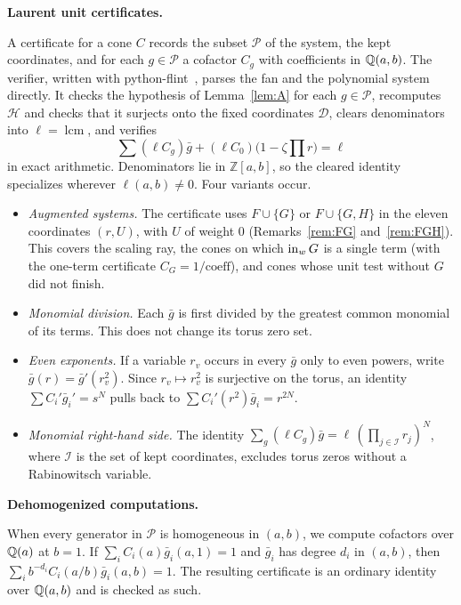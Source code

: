 \documentclass[11pt]{amsart}
\newcommand{\topic}[1]{\par\addvspace{1.4ex}\noindent\textbf{#1}\par\nobreak\smallskip\noindent}
\newcommand{\Z}{\mathbb{Z}}
\theoremstyle{definition}\newtheorem{definition}[theorem]{Definition}\theoremstyle{remark}\newtheorem{remark}[theorem]{Remark}
\begin{document}
\topic{Laurent unit certificates.} A certificate for a cone $C$ records the subset $\mathcal P$ of the system, the kept coordinates, and for each $g\in\mathcal P$ a cofactor $C_g$ with coefficients in $\mathbb{Q}(a,b)$. The verifier, written with python-flint~\citep{flint}, parses the fan and the polynomial system directly. It checks the hypothesis of Lemma~\ref{lem:A} for each $g\in\mathcal P$, recomputes $\mathcal H$ and checks that it surjects onto the fixed coordinates $\mathcal D$, clears denominators into $\ell=\operatorname{lcm}$, and verifies
\[
 \sum (\ell C_g)\bar g+(\ell C_0)\bigl(1-\zeta\textstyle\prod r\bigr)=\ell
\]
in exact arithmetic. Denominators lie in $\Z[a,b]$, so the cleared identity specializes wherever $\ell(a,b)\ne0$. Four variants occur.
\begin{itemize}
\item \emph{Augmented systems.} The certificate uses $F\cup\{G\}$ or $F\cup\{G,H\}$ in the eleven coordinates $(r,U)$, with $U$ of weight $0$ (Remarks~\ref{rem:FG} and~\ref{rem:FGH}). This covers the scaling ray, the cones on which $\operatorname{in}_wG$ is a single term (with the one-term certificate $C_G=1/\mathrm{coeff}$), and cones whose unit test without $G$ did not finish.
\item \emph{Monomial division.} Each $\bar g$ is first divided by the greatest common monomial of its terms. This does not change its torus zero set.
\item \emph{Even exponents.} If a variable $r_v$ occurs in every $\bar g$ only to even powers, write $\bar g(r)=\bar g'(r_v^2)$. Since $r_v\mapsto r_v^2$ is surjective on the torus, an identity $\sum C_i'\bar g_i'=s^N$ pulls back to $\sum C_i'(r^2)\bar g_i=r^{2N}$.
\item \emph{Monomial right-hand side.} The identity $\sum_g(\ell C_g)\bar g=\ell\,(\prod_{j\in\mathcal I}r_j)^N$, where $\mathcal I$ is the set of kept coordinates, excludes torus zeros without a Rabinowitsch variable.
\end{itemize}

\topic{Dehomogenized computations.} When every generator in $\mathcal P$ is homogeneous in $(a,b)$, we compute cofactors over $\mathbb{Q}(a)$ at $b=1$. If $\sum_i C_i(a)\bar g_i(a,1)=1$ and $\bar g_i$ has degree $d_i$ in $(a,b)$, then $\sum_i b^{-d_i}C_i(a/b)\bar g_i(a,b)=1$. The resulting certificate is an ordinary identity over $\mathbb{Q}(a,b)$ and is checked as such.
\end{document}
